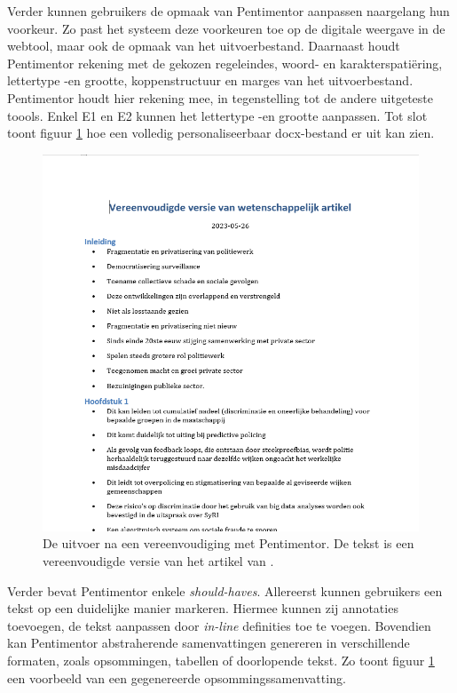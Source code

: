 \medspace

Verder kunnen gebruikers de opmaak van Pentimentor aanpassen naargelang hun voorkeur. Zo past het systeem deze voorkeuren toe op de digitale weergave in de webtool, maar ook de opmaak van het uitvoerbestand. Daarnaast houdt Pentimentor rekening met de gekozen regeleindes, woord- en karakterspatiëring, lettertype -en grootte, koppenstructuur en marges van het uitvoerbestand. Pentimentor houdt hier rekening mee, in tegenstelling tot de andere uitgeteste toools. Enkel E1 en E2 kunnen het lettertype -en grootte aanpassen. Tot slot toont figuur \ref{img:screenshot-docx-attempt} hoe een volledig personaliseerbaar docx-bestand er uit kan zien.

\begin{figure}[H]
	\includegraphics[width=\linewidth]{img/screenshot-prototype-word.png}
	\caption{De uitvoer na een vereenvoudiging met Pentimentor. De tekst is een vereenvoudigde versie van het artikel van \textcite{VanBrakel2022}.}
	\label{img:screenshot-docx-attempt}
\end{figure}

Verder bevat Pentimentor enkele \textit{should-haves}. Allereerst kunnen gebruikers een tekst op een duidelijke manier markeren. Hiermee kunnen zij annotaties toevoegen, de tekst aanpassen door \textit{in-line} definities toe te voegen. Bovendien kan Pentimentor abstraherende samenvattingen genereren in verschillende formaten, zoals opsommingen, tabellen of doorlopende tekst. Zo toont figuur \ref{img:screenshot-docx-attempt} een voorbeeld van een gegenereerde opsommingssamenvatting.


